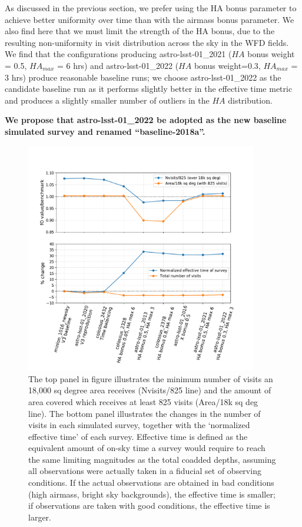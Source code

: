 \documentclass[DM,lsstdraft,authoryear,toc]{lsstdoc}
\begin{document}
As discussed in the previous section, we prefer using the HA bonus parameter to achieve better uniformity over time than with the airmass bonus parameter. We also find here that we must limit the strength of the HA bonus, due to the resulting non-uniformity in visit distribution across the sky in the WFD fields. We find that the configurations producing astro-lsst-01\_2021 ($HA$ bonus weight = 0.5, $HA_{max}$  = 6 hrs) and astro-lsst-01\_2022 ($HA$ bonus weight=0.3, $HA_{max}$ = 3 hrs) produce reasonable baseline runs; we choose astro-lsst-01\_2022 as the candidate baseline run as it performs slightly better in the effective time metric and produces a slightly smaller number of outliers in the $HA$ distribution. 

\textbf{We propose that astro-lsst-01\_2022 be adopted as the new baseline simulated survey and renamed ``baseline-2018a''.}


\begin{figure}[ht]
\centering
\includegraphics[width=0.9\textwidth]{figures/srd}
\caption{The top panel in figure illustrates the minimum number of visits an 18,000 sq degree area receives (Nvisits/825 line) and the amount of area covered which receives at least 825 visits (Area/18k sq deg line).  The bottom panel illustrates the changes in the number of visits in each simulated survey, together with the `normalized effective time' of each survey. Effective time is defined as the equivalent amount of on-sky time a survey would require to reach the same limiting magnitudes as the total coadded depths, assuming all observations were actually taken in a fiducial set of observing conditions. If the actual observations are obtained in bad conditions (high airmass, bright sky backgrounds), the effective time is smaller; if observations are taken with good conditions, the effective time is larger.
\label{fig:srd}}
\end{figure}
\end{document}
